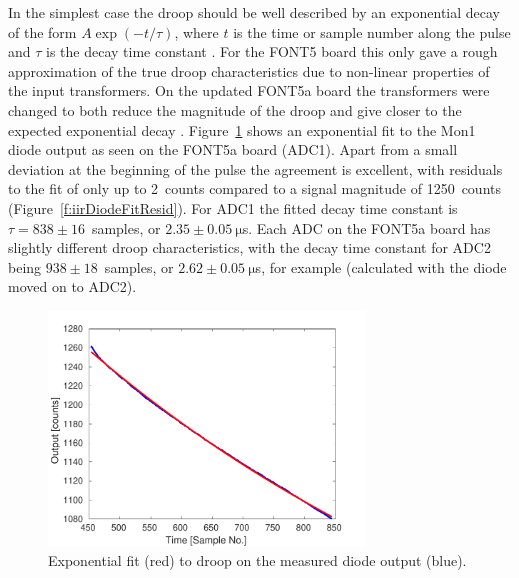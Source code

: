 In the simplest case the droop should be well described by an exponential decay of the form \(A\exp\left(-t/\tau\right)\), where \(t\) is the time or sample number along the pulse and \(\tau\) is the decay time constant \cite{colinPriv}. For the FONT5 board this only gave a rough approximation of the true droop characteristics due to non-linear properties of the input transformers. On the updated FONT5a board the transformers were changed to both reduce the magnitude of the droop and give closer to the expected exponential decay \cite{colinPriv}. Figure~\ref{f:iirDiodeFit} shows an exponential fit to the Mon1 diode output as seen on the FONT5a board (ADC1). Apart from a small deviation at the beginning of the pulse the agreement is excellent, with residuals to the fit of only up to 2~counts compared to a signal magnitude of 1250~counts (Figure~\ref{f:iirDiodeFitResid}). For ADC1 the fitted decay time constant is \(\tau = 838\pm16\)~samples, or \(2.35\pm0.05~\mathrm{\mu}\)s. Each ADC on the FONT5a board has slightly different droop characteristics, with the decay time constant for ADC2 being \(938\pm18\)~samples, or \(2.62\pm0.05~\mathrm{\mu}\)s, for example (calculated with the diode moved on to ADC2).

\begin{figure}
  \centering
  \includegraphics[width=0.75\textwidth]{Figures/commissioning/iirDiodeFit}
  \caption{Exponential fit (red) to droop on the measured diode output (blue).}
  \label{f:iirDiodeFit}
\end{figure}

